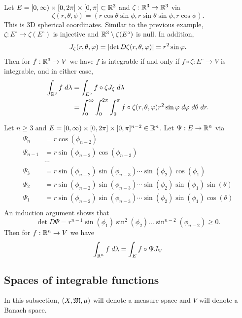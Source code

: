 \documentclass[a4paper]{article}
\begin{document}
\begin{eg}
Let $E = [0, \infty) \times [0, 2 \pi] \times [0, \pi] \subset
\mathbb{R}^3$ and $\zeta : \mathbb{R}^3 \to \mathbb{R}^3$ via 
\[
\zeta(r, \theta, \phi) = (r \cos \theta \sin \phi, 
r \sin \theta \sin \phi, r \cos \phi).
\]
This is 3D spherical coordinates. Similar to the previous 
example, $\zeta: E^\circ \to \zeta(E^\circ)$ is injective 
and $\mathbb{R}^3 \setminus \zeta(E^\circ)$ is null. 
In addition, 
\[
J_{\zeta}(r, \theta, \varphi) = 
\left\lvert \det D \zeta (r, \theta, \varphi)\right\rvert = r^2 \sin \varphi.
\]
Then for $f : \mathbb{R}^3 \to V$ we have $f$ is integrable if and 
only if $f \circ \zeta : E^\circ \to V$ is integrable,
and in either case, 
\[
\begin{aligned}
\int_{\mathbb{R}^3} f \; d \lambda 
&= \int_{E^\circ} f \circ \zeta J_{\zeta} \; d \lambda \\
&= \int_0^\infty \int_0^{2\pi} \int_0^\pi 
f \circ \zeta(r, \theta, \varphi) r^2 \sin \varphi \; d \varphi \; d \theta
\; d r.
\end{aligned}
\]
\end{eg}

\begin{eg}
Let $n \geq 3$ and $E = [0, \infty) \times [0, 2 \pi] 
\times [0, \pi]^{n-2} \in \mathbb{R}^n$. Let $\Psi: E \to \mathbb{R}^n$ 
via 
\[
\begin{aligned}
\Psi_n &= r \cos (\phi_{n-2}) \\
\Psi_{n-1} &= r \sin (\phi_{n-2}) \cos (\phi_{n-3}) \\
&\cdots \\
\Psi_3 &= r \sin (\phi_{n-2}) \sin (\phi_{n-3}) \cdots \sin (\phi_2) 
\cos (\phi_1) \\
\Psi_2 &= r \sin (\phi_{n-2}) \sin (\phi_{n-3}) \cdots \sin (\phi_2) 
\sin (\phi_1) \sin (\theta) \\
\Psi_1 &= r \sin (\phi_{n-2}) \sin (\phi_{n-3}) \cdots \sin (\phi_2) 
\sin (\phi_1) \cos (\theta) \\
\end{aligned}
\]
An induction argument shows that 
\[
\det D\Psi = r^{n-1} \sin (\phi_1) \sin^2 (\phi_2) 
\dots \sin^{n-2} (\phi_{n-2}) \geq 0.
\]
Then for $f : \mathbb{R}^n \to V$ we have 
\[
\int_{\mathbb{R}^n} f \; d \lambda = \int_E f \circ \Psi J_{\Psi}
\]
\end{eg}

\subsection{Spaces of integrable functions}

In this subsection, $(X, \mathfrak{M}, \mu)$ will denote a measure
space and $V$ will denote a Banach space.
\end{document}
